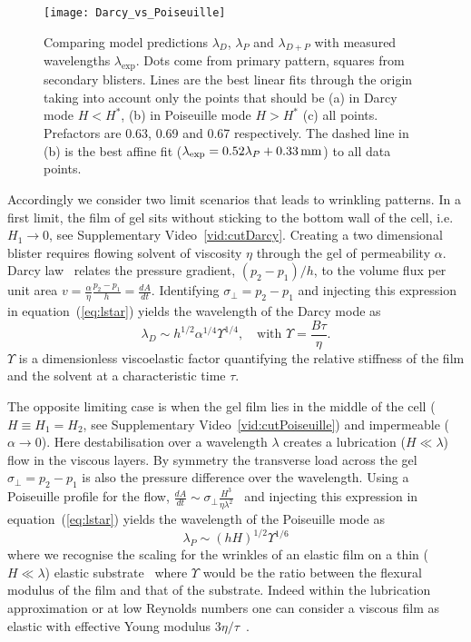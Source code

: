 \documentclass[twocolumn,superscriptaddress,showpacs,preprintnumbers,
amsmath,amssymb,prl]{revtex4-1}
\begin{document}
\begin{figure*}
	\texttt{[image: Darcy\_vs\_Poiseuille]}
	\caption{Comparing model predictions $\lambda_D$, $\lambda_P$ and $\lambda_{D+P}$ with measured wavelengths $\lambda_\text{exp}$. Dots come from primary pattern, squares from secondary blisters. Lines are the best linear fits through the origin taking into account only the points that should be (a) in Darcy mode $H<H^*$, (b) in Poiseuille mode $H>H^*$ (c) all points. Prefactors are 0.63, 0.69 and 0.67 respectively. The dashed line in (b) is the best affine fit ($\lambda_{\rm exp}=0.52\lambda_{P}+\SI{0.33}{\milli\metre}$) to all data points.}
	\label{fig:DarcyPoiseuille}
\end{figure*}

Accordingly we consider two limit scenarios that leads to wrinkling patterns. In a first limit, the film of gel sits without sticking to the bottom wall of the cell, i.e. $H_1\rightarrow0$, see Supplementary Video~\ref{vid:cutDarcy}. Creating a two dimensional blister requires flowing solvent of viscosity $\eta$ through the gel of permeability $\alpha$. Darcy law~\cite{Darcy1856} relates the pressure gradient, $(p_2-p_1)/h$, to the volume flux per unit area $v = \frac{\alpha}{\eta}\frac{p_2-p_1}{h} = \frac{dA}{dt}$. Identifying $\sigma_{\perp}=p_2-p_1$ and injecting this expression in equation~(\ref{eq:lstar}) yields the wavelength of the Darcy mode as
\begin{equation}
\lambda_D \sim h^{1/2} \alpha^{1/4} \Upsilon^{1/4},\quad\text{with } \Upsilon = \frac{B\tau}{\eta}.
\end{equation}
$\Upsilon$ is a dimensionless viscoelastic factor quantifying the relative stiffness of the film and the solvent at a characteristic time $\tau$. 

The opposite limiting case is when the gel film lies in the middle of the cell ($H\equiv H_1=H_2$, see Supplementary Video~\ref{vid:cutPoiseuille}) and impermeable ($\alpha\rightarrow 0$). Here destabilisation over a wavelength $\lambda$ creates a lubrication ($H\ll\lambda$) flow in the viscous layers. By symmetry the transverse load across the gel $\sigma_{\perp}=p_2-p_1$ is also the pressure difference over the wavelength. Using a Poiseuille profile for the flow, $\frac{dA}{dt} \sim \sigma_{\perp} \frac{H^3}{\eta\lambda^2}$~\cite{Poiseuille1842} and injecting this expression in equation~(\ref{eq:lstar}) yields the wavelength of the Poiseuille mode as
\begin{equation}
\lambda_P \sim (hH)^{1/2} \Upsilon^{1/6}
\end{equation}
where we recognise the scaling for the wrinkles of an elastic film on a thin ($H\ll\lambda$) elastic substrate~\cite{Cerda2003} where $\Upsilon$ would be the ratio between the flexural modulus of the film and that of the substrate. Indeed within the lubrication approximation or at low Reynolds numbers one can consider a viscous film as elastic with effective Young modulus $3\eta/\tau$~\cite{Biot1957,Boudaoud2001}.
\end{document}
